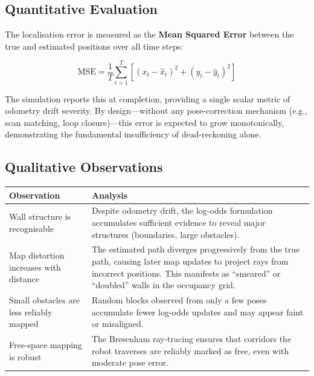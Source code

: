 \documentclass[12pt,a4paper]{article}
\begin{document}
\subsection{Quantitative Evaluation}

The localisation error is measured as the \textbf{Mean Squared Error} between the true and estimated positions over all time steps:

\begin{equation}
    \text{MSE} = \frac{1}{T}\sum_{t=1}^{T}\left[(x_t - \hat{x}_t)^2 + (y_t - \hat{y}_t)^2\right]
\end{equation}

The simulation reports this at completion, providing a single scalar metric of odometry drift severity. By design---without any pose-correction mechanism (e.g., scan matching, loop closure)---this error is expected to grow monotonically, demonstrating the fundamental insufficiency of dead-reckoning alone.

\subsection{Qualitative Observations}

\begin{table}[H]
\centering
\begin{tabular}{@{}p{4.5cm}p{9cm}@{}}
\toprule
\textbf{Observation} & \textbf{Analysis} \\
\midrule
Wall structure is recognisable & Despite odometry drift, the log-odds formulation accumulates sufficient evidence to reveal major structures (boundaries, large obstacles). \\[4pt]
Map distortion increases with distance & The estimated path diverges progressively from the true path, causing later map updates to project rays from incorrect positions. This manifests as ``smeared'' or ``doubled'' walls in the occupancy grid. \\[4pt]
Small obstacles are less reliably mapped & Random blocks observed from only a few poses accumulate fewer log-odds updates and may appear faint or misaligned. \\[4pt]
Free-space mapping is robust & The Bresenham ray-tracing ensures that corridors the robot traverses are reliably marked as free, even with moderate pose error. \\
\bottomrule
\end{tabular}
\end{table}

\end{document}
